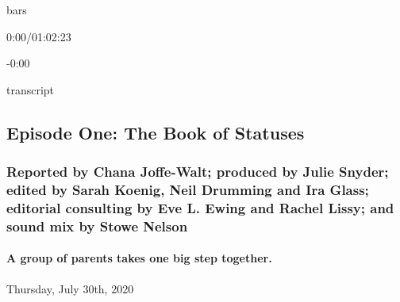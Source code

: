 bars

0:00/01:02:23

-0:00

transcript

\hypertarget{episode-one-the-book-of-statuses-2}{%
\subsection{Episode One: The Book of
Statuses}\label{episode-one-the-book-of-statuses-2}}

\hypertarget{reported-by-chana-joffe-walt-produced-by-julie-snyder-edited-by-sarah-koenig-neil-drumming-and-ira-glass-editorial-consulting-by-eve-l-ewing-and-rachel-lissy-and-sound-mix-by-stowe-nelson-1}{%
\subsubsection{Reported by Chana Joffe-Walt; produced by Julie Snyder;
edited by Sarah Koenig, Neil Drumming and Ira Glass; editorial
consulting by Eve L. Ewing and Rachel Lissy; and sound mix by Stowe
Nelson}\label{reported-by-chana-joffe-walt-produced-by-julie-snyder-edited-by-sarah-koenig-neil-drumming-and-ira-glass-editorial-consulting-by-eve-l-ewing-and-rachel-lissy-and-sound-mix-by-stowe-nelson-1}}

\hypertarget{a-group-of-parents-takes-one-big-step-together-2}{%
\paragraph{A group of parents takes one big step
together.}\label{a-group-of-parents-takes-one-big-step-together-2}}

Thursday, July 30th, 2020


